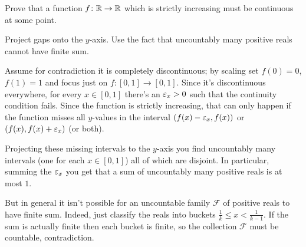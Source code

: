 \begin{problem}
	\twochili
	Prove that a function $f \colon \mathbb R \to \mathbb R$ which is strictly increasing
	must be continuous at some point.
	\begin{hint}
		Project gaps onto the $y$-axis.
		Use the fact that uncountably many positive reals cannot have finite sum.
	\end{hint}
	\begin{sol}
		Assume for contradiction it is completely discontinuous;
		by scaling set $f(0) = 0$, $f(1) = 1$ and focus just on $f \colon [0,1] \to [0,1]$.
		Since it's discontinuous everywhere,
		for every $x \in [0,1]$ there's an $\varepsilon_x > 0$
		such that the continuity condition fails.
		Since the function is strictly increasing,
		that can only happen if the
		function misses all $y$-values in the interval
		$(f(x)-\varepsilon_x, f(x))$ or $(f(x), f(x)+\varepsilon_x)$ (or both).

		Projecting these missing intervals to the $y$-axis you find uncountably
		many intervals (one for each $x \in [0,1]$) all of which are disjoint.
		In particular, summing the $\varepsilon_x$ you get that a sum of uncountably
		many positive reals is at most $1$.

		But in general it isn't possible for an uncountable family $\mathcal F$
		of positive reals to have finite sum.
		Indeed, just classify the reals into buckets $\frac1k \le x < \frac1{k-1}$.
		If the sum is actually finite then each bucket is finite,
		so the collection $\mathcal F$ must be countable, contradiction.
	\end{sol}
\end{problem}

